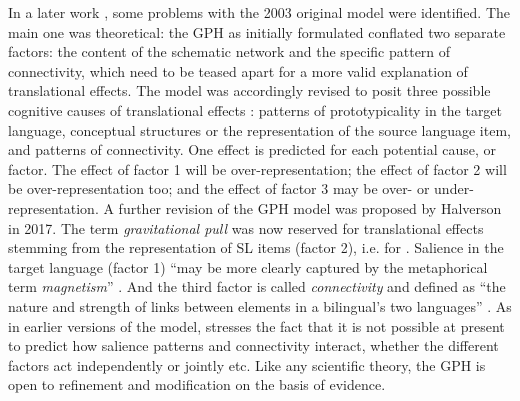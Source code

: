 \documentclass[output=paper,english,spanish,german,english]{langsci/langscibook}
\begin{document}
\noindent In a later work \parencite{halverson10}, some problems with the 2003 original model were identified. The main one was theoretical: the GPH as initially formulated conflated two separate factors: the content of the schematic network and the specific pattern of connectivity, which need to be teased apart for a more valid explanation of translational effects. The model was accordingly revised to posit three possible cognitive causes of translational effects \parencites[356]{halverson10}[192]{hareide17}: patterns of prototypicality in the target language, conceptual structures or the representation of the source language item, and patterns of connectivity. One effect is predicted for each potential cause, or factor. The effect of factor 1 will be over-representation; the effect of factor 2 will be over-representation too; and the effect of factor 3 may be over- or under-representation. A further revision of the GPH model was proposed by Halverson in 2017. The term \textit{gravitational pull} was now reserved for translational effects stemming from the representation of SL items (factor 2), i.e. for . Salience in the target language (factor 1) \enquote{may be more clearly captured by the metaphorical term \textit{magnetism}} \parencite*[14]{halverson17}. And the third factor is called \textit{connectivity} and defined as \enquote{the nature and strength of links between elements in a bilingual’s two languages} \parencite*[14]{halverson17}. As in earlier versions of the model, \citet[28]{halverson17} stresses the fact that it is not possible at present to predict how salience patterns and connectivity interact, whether the different factors act independently or jointly etc. Like any scientific theory, the GPH is open to refinement and modification on the basis of evidence.
\end{document}
